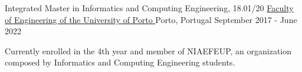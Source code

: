 
\begin{cventries}
  \cventry
    {Integrated Master in Informatics and Computing Engineering, 18.01/20} %
    {\href{https://sigarra.up.pt/feup/en/web_page.inicial}{Faculty of Engineering of the University of Porto \faExternalLink}} %
    {Porto, Portugal} %
    {September 2017 - June 2022} %
    {
      \begin{cvitems}
        \item {Currently enrolled in the 4th year and member of NIAEFEUP, an organization composed by Informatics and Computing Engineering students.}
      \end{cvitems}
    }
\end{cventries}
